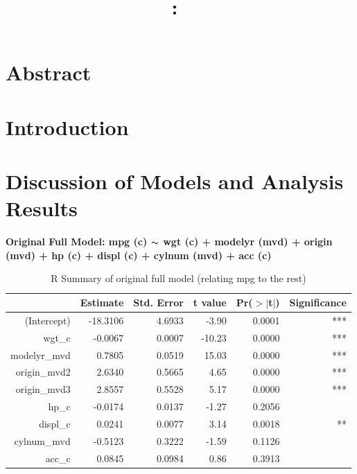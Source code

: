 \documentclass{article}
\title{
    \vspace{2in}
    \textmd{\textbf{\hmwkClass:\ \hmwkTitle}}\\
    \normalsize\vspace{0.1in}\small\vspace{0.1in}\large{\textit{\hmwkClassInstructor}}
    \vspace{3in}
}
\author{\hmwkAuthorName}
\date{}
\newcommand{\mt}[1]{\ensuremath{#1}}
\newcommand{\tl}{\mt{\thicksim} }
\begin{document}
\maketitle

\newpage

\tableofcontents

\listoftables

\listoffigures

\newpage

\section{Abstract}

\newpage

\section{Introduction}

\newpage

\section{Discussion of Models and Analysis Results}

\newpage

\textbf{Original Full Model: mpg (c) \tl wgt (c) + modelyr (mvd) + origin (mvd) + hp (c) + displ (c) + cylnum (mvd) + acc (c)}

\begin{table}[ht]
\centering
\begin{tabular}{rrrrrr}
  \hline
 & Estimate & Std. Error & t value & Pr($>$$|$t$|$) & Significance \\ 
  \hline
(Intercept) & -18.3106 & 4.6933 & -3.90 & 0.0001 & *** \\ 
  wgt\_c & -0.0067 & 0.0007 & -10.23 & 0.0000 & ***  \\ 
  modelyr\_mvd & 0.7805 & 0.0519 & 15.03 & 0.0000 & ***  \\ 
  origin\_mvd2 & 2.6340 & 0.5665 & 4.65 & 0.0000 & ***  \\ 
  origin\_mvd3 & 2.8557 & 0.5528 & 5.17 & 0.0000 & ***  \\ 
  hp\_c & -0.0174 & 0.0137 & -1.27 & 0.2056 & \\ 
  displ\_c & 0.0241 & 0.0077 & 3.14 & 0.0018 & ** \\ 
  cylnum\_mvd & -0.5123 & 0.3222 & -1.59 & 0.1126 & \\ 
  acc\_c & 0.0845 & 0.0984 & 0.86 & 0.3913 & \\ 
   \hline
\end{tabular}
\caption{R Summary of original full model (relating mpg to the rest)}
\label{tab:myfirsttable}
\end{table}
\end{document}
